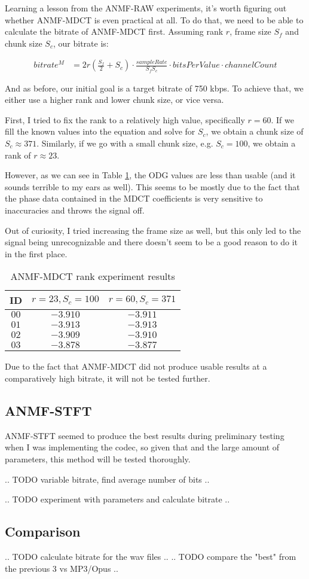 Learning a lesson from the ANMF-RAW experiments, it's worth figuring out whether ANMF-MDCT is even practical at all. To do that, we need to be able to calculate the bitrate of ANMF-MDCT first. Assuming rank $r$, frame size $S_f$ and chunk size $S_c$, our bitrate is:

\begin{align}
bitrate^M &= 2r(\frac{S_f}{2} + S_c) \cdot \frac{sampleRate}{S_fS_c} \cdot bitsPerValue \cdot channelCount
\end{align}

And as before, our initial goal is a target bitrate of 750 kbps. To achieve that, we either use a higher rank and lower chunk size, or vice versa.

First, I tried to fix the rank to a relatively high value, specifically $r = 60$. If we fill the known values into the equation and solve for $S_c$, we obtain a chunk size of $S_c \approx 371$. Similarly, if we go with a small chunk size, e.g. $S_c = 100$, we obtain a rank of $r \approx 23$.

However, as we can see in Table \ref{tab:anmf_mdct_rank}, the ODG values are less than usable (and it sounds terrible to my ears as well). This seems to be mostly due to the fact that the phase data contained in the MDCT coefficients is very sensitive to inaccuracies and throws the signal off.

Out of curiosity, I tried increasing the frame size as well, but this only led to the signal being unrecognizable and there doesn't seem to be a good reason to do it in the first place.

\begin{table}[htbp]\caption{ANMF-MDCT rank experiment results}
	\label{tab:anmf_mdct_rank}
	\centering
	\begin{tabular}{|c|c|c|}
		\hline
		ID & $r = 23, S_c = 100$ & $r = 60, S_c = 371$ \\ \hline
		$00$ & $-3.910$ & $-3.911$ \\
		$01$ & $-3.913$ & $-3.913$ \\
		$02$ & $-3.909$ & $-3.910$ \\
		$03$ & $-3.878$ & $-3.877$ \\		
		\hline
	\end{tabular}
\end{table}

Due to the fact that ANMF-MDCT did not produce usable results at a comparatively high bitrate, it will not be tested further.

\subsection{ANMF-STFT}
ANMF-STFT seemed to produce the best results during preliminary testing when I was implementing the codec, so given that and the large amount of parameters, this method will be tested thoroughly.

.. TODO variable bitrate, find average number of bits ..

.. TODO experiment with parameters and calculate bitrate ..

\subsection{Comparison}
.. TODO calculate bitrate for the wav files ..
.. TODO compare the "best" from the previous 3 vs MP3/Opus ..
